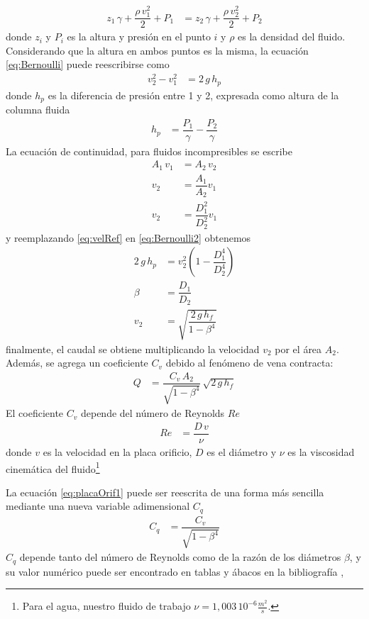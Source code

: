 \begin{align}
 z_1 \, \gamma + \dfrac{\rho \,v_1^2}{2} + P_1 &= z_2 \, \gamma + \dfrac{\rho \,v_2^2}{2} + P_2
\label{eq:Bernoulli}
\end{align}
donde $z_i$ y $P_i$ es la altura y presión en el punto $i$ y $\rho$ es 
la densidad del fluido. 
Considerando que la altura en ambos puntos es la misma, la ecuación
\eqref{eq:Bernoulli} puede reescribirse como
\begin{align}
 v_2^2 - v_1^2 &= 2\,g\,h_p
 \label{eq:Bernoulli2}
\end{align}
donde $h_p$ es la diferencia de presión entre 1 y 2, expresada como 
altura de la columna fluida
\begin{align}
 h_p &= \dfrac{P_1}{\gamma}-\dfrac{P_2}{\gamma}
\end{align}
La ecuación de continuidad, para fluidos incompresibles se escribe
\begin{align}
 A_1\,v_1 &= A_2\,v_2 \\
 v_2 &= \dfrac{A_1}{A_2} v_1 \\
 v_2 &= \dfrac{D_1^2}{D_2^2} v_1
 \label{eq:velRef}
\end{align}
y reemplazando \eqref{eq:velRef} en \eqref{eq:Bernoulli2} obtenemos
\begin{align}
 2 \, g \, h_p &= v_2^2 \left( 1 - \dfrac{D_1^4}{D_2^4} \right)\\
 \beta &= \dfrac{D_1}{D_2}\\
 v_2 &= \sqrt{\dfrac{2 \, g \, h_f}{1-\beta^4}} 
\end{align}
finalmente, el caudal se obtiene multiplicando la velocidad $v_2$ por el
área $A_2$.
Además, se agrega un coeficiente $C_v$ debido al fenómeno de vena contracta:
\begin{align}
 Q &= \dfrac{C_v \, A_2}{\sqrt{1-\beta^4}}\, \sqrt{2 \, g \, h_f}
 \label{eq:placaOrif1}
\end{align}
El coeficiente $C_v$ depende del número de Reynolds $Re$ \cite{bib:Mataix, bib:ApuntesPuglesiPlacaOrif}
\begin{align}
Re &= \dfrac{D\,v}{\nu}
\end{align}
donde $v$ es la velocidad en la placa orificio, $D$ es el diámetro y ${\nu}$
es la viscosidad cinemática del fluido\footnote{Para el agua, nuestro fluido de trabajo
$\nu = 1,003\,10^{-6} \frac{m^2}{s}$.}

La ecuación \eqref{eq:placaOrif1} puede ser reescrita de una forma más sencilla
mediante una nueva variable adimensional $C_q$
\begin{align}
 C_q &= \dfrac{C_v}{\sqrt{1-\beta^4}}
\end{align}
$C_q$ depende tanto del número de Reynolds como de la razón de los diámetros $\beta$, 
y su valor numérico puede ser encontrado en tablas y ábacos en la bibliografía \cite{bib:Mataix},

